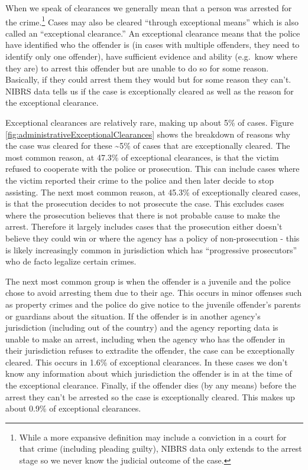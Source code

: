 \documentclass[
  12pt,
  openany]{book}
\begin{document}
When we speak of clearances we generally mean that a person was arrested for the crime.\footnote{While a more expansive definition may include a conviction in a court for that crime (including pleading guilty), NIBRS data only extends to the arrest stage so we never know the judicial outcome of the case.} Cases may also be cleared ``through exceptional means'' which is also called an ``exceptional clearance.'' An exceptional clearance means that the police have identified who the offender is (in cases with multiple offenders, they need to identify only one offender), have sufficient evidence and ability (e.g.~know where they are) to arrest this offender but are unable to do so for some reason. Basically, if they could arrest them they would but for some reason they can't. NIBRS data tells us if the case is exceptionally cleared as well as the reason for the exceptional clearance.

Exceptional clearances are relatively rare, making up about 5\% of cases. Figure \ref{fig:administrativeExceptionalClearances} shows the breakdown of reasons why the case was cleared for these \textasciitilde5\% of cases that are exceptionally cleared. The most common reason, at 47.3\% of exceptional clearances, is that the victim refused to cooperate with the police or prosecution. This can include cases where the victim reported their crime to the police and then later decide to stop assisting. The next most common reason, at 45.3\% of exceptionally cleared cases, is that the prosecution decides to not prosecute the case. This excludes cases where the prosecution believes that there is not probable cause to make the arrest. Therefore it largely includes cases that the prosecution either doesn't believe they could win or where the agency has a policy of non-prosecution - this is likely increasingly common in jurisdiction which has ``progressive prosecutors'' who de facto legalize certain crimes.

The next most common group is when the offender is a juvenile and the police chose to avoid arresting them due to their age. This occurs in minor offenses such as property crimes and the police do give notice to the juvenile offender's parents or guardians about the situation. If the offender is in another agency's jurisdiction (including out of the country) and the agency reporting data is unable to make an arrest, including when the agency who has the offender in their jurisdiction refuses to extradite the offender, the case can be exceptionally cleared. This occurs in 1.6\% of exceptional clearances. In these cases we don't know any information about which jurisdiction the offender is in at the time of the exceptional clearance. Finally, if the offender dies (by any means) before the arrest they can't be arrested so the case is exceptionally cleared. This makes up about 0.9\% of exceptional clearances.
\end{document}
